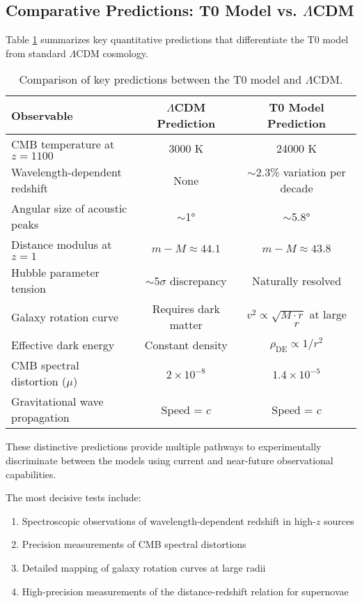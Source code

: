 \documentclass[12pt,a4paper]{article} %
\begin{document}
	\subsection{Comparative Predictions: T0 Model vs. $\Lambda$CDM}
	\label{subsec:comparison}
	
	Table \ref{tab:comparative_predictions} summarizes key quantitative predictions
	that differentiate the T0 model from standard $\Lambda$CDM cosmology.
	
	\begin{table}[ht]
		\centering
		\caption{Comparison of key predictions between the T0 model and $\Lambda$CDM.}
		\label{tab:comparative_predictions}
		\begin{tabular}{lcc} %
			\hline
			\textbf{Observable} & \textbf{$\Lambda$CDM Prediction} & \textbf{T0 Model Prediction} \\
			\hline
			CMB temperature at $z=1100$ & 3000 K & 24000 K \\
			Wavelength-dependent redshift & None & $\sim$2.3\% variation per decade \\
			Angular size of acoustic peaks & $\sim$1° & $\sim$5.8° \\
			Distance modulus at $z=1$ & $m-M \approx 44.1$ & $m-M \approx 43.8$ \\
			Hubble parameter tension & $\sim$5$\sigma$ discrepancy & Naturally resolved \\
			Galaxy rotation curve & Requires dark matter & $v^2 \propto \sqrt{M\cdot r}$ at large $r$ \\
			Effective dark energy & Constant density & $\rho_{\text{DE}} \propto 1/r^2$ \\
			CMB spectral distortion ($\mu$) & $2 \times 10^{-8}$ & $1.4 \times 10^{-5}$ \\
			Gravitational wave propagation & Speed = $c$ & Speed = $c$ \\
			\hline
		\end{tabular}
	\end{table}
	
	These distinctive predictions provide multiple pathways
	to experimentally discriminate between the models
	using current and near-future observational capabilities.
	
	The most decisive tests include:
	\begin{enumerate}
		\item Spectroscopic observations
		of wavelength-dependent redshift in high-$z$ sources
		\item Precision measurements
		of CMB spectral distortions
		\item Detailed mapping
		of galaxy rotation curves at large radii
		\item High-precision measurements
		of the distance-redshift relation for supernovae
	\end{enumerate}
	
\end{document}
